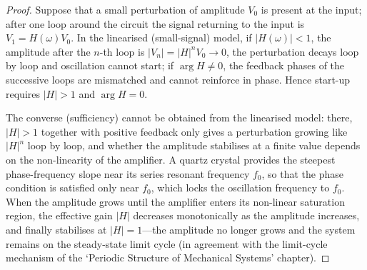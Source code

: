 \begin{proof}
Suppose that a small perturbation of amplitude $V_0$ is present at the input; after one loop around the circuit the signal returning to the input is $V_1 = H(\omega)V_0$. In the linearised (small-signal) model, if $|H(\omega)|<1$, the amplitude after the $n$-th loop is $|V_n| = |H|^n V_0 \to 0$, the perturbation decays loop by loop and oscillation cannot start; if $\arg H \neq 0$, the feedback phases of the successive loops are mismatched and cannot reinforce in phase. Hence start-up requires $|H|>1$ and $\arg H = 0$.

The converse (sufficiency) cannot be obtained from the linearised model: there, $|H|>1$ together with positive feedback only gives a perturbation growing like $|H|^n$ loop by loop, and whether the amplitude stabilises at a finite value depends on the non-linearity of the amplifier. A quartz crystal provides the steepest phase-frequency slope near its series resonant frequency $f_0$, so that the phase condition is satisfied only near $f_0$, which locks the oscillation frequency to $f_0$. When the amplitude grows until the amplifier enters its non-linear saturation region, the effective gain $|H|$ decreases monotonically as the amplitude increases, and finally stabilises at $|H|=1$---the amplitude no longer grows and the system remains on the steady-state limit cycle (in agreement with the limit-cycle mechanism of the `Periodic Structure of Mechanical Systems' chapter).
\end{proof}

